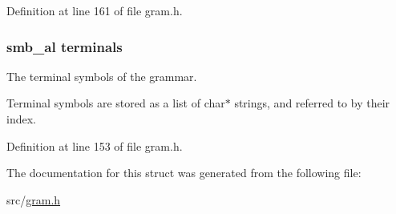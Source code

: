 \-Definition at line 161 of file gram.\-h.

\hypertarget{structcnf_ae85a135e82c4af0e75739a21b3ec03b4}{
\subsubsection[{terminals}]{\setlength{\rightskip}{0pt plus 5cm}smb\-\_\-al {\bf terminals}}}\label{structcnf_ae85a135e82c4af0e75739a21b3ec03b4}


\-The terminal symbols of the grammar. 

\-Terminal symbols are stored as a list of char$\ast$ strings, and referred to by their index. 

\-Definition at line 153 of file gram.\-h.



\-The documentation for this struct was generated from the following file\-:\begin{DoxyCompactItemize}
\item 
src/\hyperlink{gram_8h}{gram.\-h}\end{DoxyCompactItemize}
